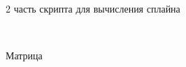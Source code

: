 \documentclass[russian,utf8,nocolumnxxxi,nocolumnxxxii]{eskdtext}
\begin{document}
\begin{figure}[H]
 \\
\caption{2 часть скрипта для вычисления сплайна}
\end{figure}

\begin{figure}[H]
 \\
\caption{Матрица }
\end{figure}
\end{document}

